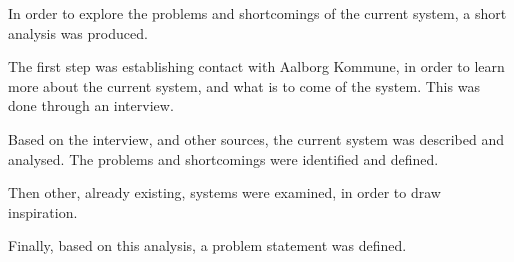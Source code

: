 In order to explore the problems and shortcomings of the current \citybike system, a short analysis was produced.

The first step was establishing contact with Aalborg Kommune, in order to learn more about the current system, and what is to come of the system.
This was done through an interview.

Based on the interview, and other sources, the current system was described and analysed.
The problems and shortcomings were identified and defined.

Then other, already existing, systems were examined, in order to draw inspiration.

Finally, based on this analysis, a problem statement was defined.
